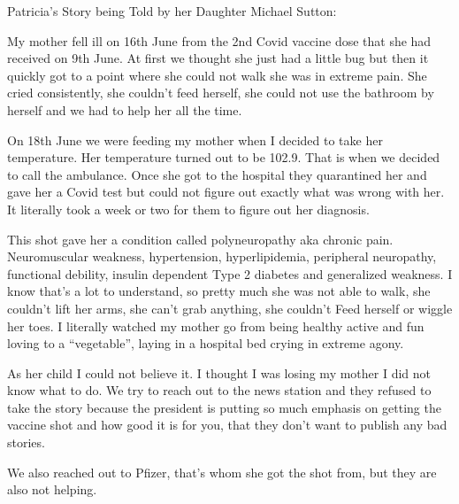 Patricia’s Story being Told by her Daughter Michael Sutton:

My mother fell ill on 16th June from the 2nd Covid vaccine dose that she had
received on 9th June. At first we thought she just had a little bug but then it
quickly got to a point where she could not walk she was in extreme pain. She
cried consistently, she couldn’t feed herself, she could not use the bathroom by
herself and we had to help her all the time.

On 18th June we were feeding my mother when I decided to take her
temperature. Her temperature turned out to be 102.9. That is when we decided to
call the ambulance. Once she got to the hospital they quarantined her and gave
her a Covid test but could not figure out exactly what was wrong with her. It
literally took a week or two for them to figure out her diagnosis.

This shot gave her a condition called polyneuropathy aka chronic
pain. Neuromuscular weakness, hypertension, hyperlipidemia, peripheral
neuropathy, functional debility, insulin dependent Type 2 diabetes and
generalized weakness. I know that’s a lot to understand, so pretty much she was
not able to walk, she couldn’t lift her arms, she can’t grab anything, she
couldn’t Feed herself or wiggle her toes. I literally watched my mother go from
being healthy active and fun loving to a “vegetable”, laying in a hospital bed
crying in extreme agony.

As her child I could not believe it. I thought I was losing my mother I did not
know what to do. We try to reach out to the news station and they refused to
take the story because the president is putting so much emphasis on getting the
vaccine shot and how good it is for you, that they don’t want to publish any bad
stories.

We also reached out to Pfizer, that’s whom she got the shot from, but they are
also not helping.

